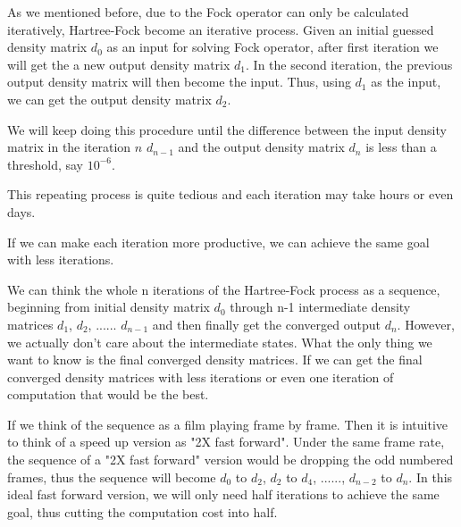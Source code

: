 \documentclass[twoside]{article}
\begin{document}





As we mentioned before,  due to the Fock operator can only be calculated iteratively, Hartree-Fock become an iterative process. Given an initial guessed density matrix $d_0$ as an input for solving Fock operator, after first iteration we will get the a new output density matrix $d_1$. 
In the second iteration, the previous output density matrix will then become the input. Thus, using $d_1$ as the input, we can get the output density matrix $d_2$. 

We will keep doing this procedure until the difference between the input density matrix in the iteration $n$ $d_{n-1}$  and the output density matrix $d_n$ is less than a threshold, say $10^{-6}$. 

This repeating process is quite tedious and each iteration may take hours or even days. %

If we can make each iteration more productive, we can achieve the same goal with less iterations. 

We can think the whole n iterations of the Hartree-Fock process as a sequence, beginning from initial density matrix $d_0$ through n-1 intermediate density matrices $d_1$,  $d_2$,  ...... $d_{n-1}$ and then finally get the converged output $d_{n}$. However, we actually don't care about the intermediate states. What the only thing we want to know is the final converged density matrices. If we can get the final converged density matrices with less iterations or even one iteration of computation that would be the best. 


If we think of the sequence as a film playing frame by frame. Then it is intuitive to think of a speed up version as "2X fast forward". 
Under the same frame rate, the sequence of a  "2X fast forward" version would be dropping the odd numbered frames, thus the sequence will become $d_0$ to $d_2$, $d_2$ to $d_4$, ......, $d_{n-2}$ to $d_n$. In this ideal fast forward version, we will only need half iterations to achieve the same goal, thus cutting the computation cost into half.
\end{document}
